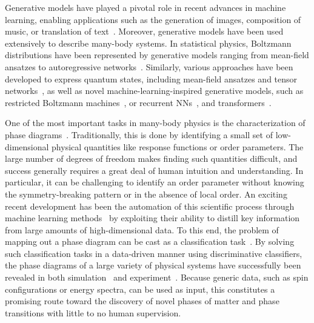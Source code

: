 \documentclass[twocolumn,aps,prl,superscriptaddress,tightlines,nofootinbib]{revtex4-2}
\begin{document}
\indent Generative models have played a pivotal role in recent advances in machine learning, enabling applications such as the generation of images, composition of music, or translation of text~\cite{vaswani:2017}. Moreover, generative models have been used extensively to describe many-body systems. In statistical physics, Boltzmann distributions have been represented by generative models ranging from mean-field ansatzes to autoregressive networks~\cite{wu:2019}. Similarly, various approaches have been developed to express quantum states, including mean-field ansatzes and tensor networks~\cite{schollwock:2011}, as well as novel machine-learning-inspired generative models, such as restricted Boltzmann machines~\cite{carleo:2017}, or recurrent NNs~\cite{hibat:2020}, and transformers~\cite{cha:2021}.

\indent One of the most important tasks in many-body physics is the characterization of phase diagrams~\cite{goldenfeld:2018,sachdev:2011}. Traditionally, this is done by identifying a small set of low-dimensional physical quantities like response functions or order parameters. The large number of degrees of freedom makes finding such quantities difficult, and success generally requires a great deal of human intuition and understanding. In particular, it can be challenging to identify an order parameter without knowing the symmetry-breaking pattern or in the absence of local order. An exciting recent development has been the automation of this scientific process through machine learning methods~\cite{carleo:2019,terayama:2019,guan:2020,dawid:2022} by exploiting their ability to distill key information from large amounts of high-dimensional data. To this end, the problem of mapping out a phase diagram can be cast as a classification task~\cite{carrasquilla:2017,van:2017,wetzel2:2017,schaefer:2019}. By solving such classification tasks in a data-driven manner using discriminative classifiers, the phase diagrams of a large variety of physical systems have successfully been revealed in both simulation~\cite{carrasquilla:2017,van:2017,wetzel2:2017,schaefer:2019,liu:2018,beach:2018,suchsland:2018,lee:2019,kharkov:2020,guo:2020,greplova:2020,arnold:2021,gavreev:2022,zvyagintseva:2022,tibaldi:2023,guo:2023,schlomer:2023} and experiment~\cite{rem:2019,bohrdt:2021,miles:2023}. Because generic data, such as spin configurations or energy spectra, can be used as input, this constitutes a promising route toward the discovery of novel phases of matter and phase transitions with little to no human supervision.
\end{document}
